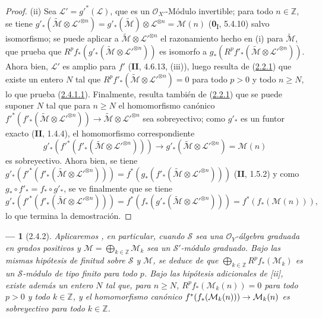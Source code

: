 \documentclass[10pt,oneside,openany]{book}
\theoremstyle{egaenv}\newtheorem*{env}{---}
\theoremstyle{egastatement}
\theoremstyle{egadescription}
\newcommand{\oldpage}[2][]{\marginnote{\normalfont\scriptsize\textbf{#1}\,|\,#2}\ignorespaces}
\renewcommand{\geq}{\geqslant}
\renewcommand{\to}{\mathchoice{\longrightarrow}{\rightarrow}{\rightarrow}{\rightarrow}}
\begin{document}
\begin{proof}
(ii) Sea $\mathcal L'=g'^*(\mathcal L)$, que es un
$\mathcal O_{X'}$-Módulo invertible; para todo $n\in\mathbb Z$, se tiene
$g'_*(\widetilde{\mathcal M}\otimes\mathcal L'^{\otimes n})
=g'_*(\widetilde{\mathcal M})\otimes\mathcal L^{\otimes n}
=\mathcal M(n)$
(\textbf{0}\textsubscript{I}, 5.4.10) salvo isomorfismo; se puede aplicar
a $\widetilde{\mathcal M}\otimes\mathcal L'^{\otimes n}$ el
razonamiento hecho en (i) para $\widetilde{\mathcal M}$, que prueba que
$R^pf_*(g'_*(\widetilde{\mathcal M}\otimes\mathcal L'^{\otimes n}))$
es isomorfo a
$g_*(R^pf'_*(\widetilde{\mathcal M}\otimes\mathcal L'^{\otimes n}))$.
Ahora bien, $\mathcal L'$ es amplio para $f'$ (\textbf{II}, 4.6.13, (iii)), luego resulta
de (\hyperref[III.2.2.1-fr]{2.2.1}) que existe un entero $N$ tal que
$R^pf'_*(\widetilde{\mathcal M}\otimes\mathcal L'^{\otimes n})=0$
para todo $p>0$ y todo $n\geq N$, lo que prueba
(\hyperref[III.2.4.1.1-fr]{2.4.1.1}). Finalmente, resulta también de
(\hyperref[III.2.2.1-fr]{2.2.1}) que se puede suponer $N$ tal que para
$n\geq N$ el homomorfismo canónico
$f'^*(f'_*(\widetilde{\mathcal M}\otimes\mathcal L'^{\otimes n}))
\longrightarrow\widetilde{\mathcal M}\otimes\mathcal L'^{\otimes n}$
sea sobreyectivo; como $g'_*$ es un funtor exacto (\textbf{II}, 1.4.4),
el homomorfismo correspondiente
\[
g'_*(f'^*(f'_*(\widetilde{\mathcal M}\otimes
\mathcal L'^{\otimes n})))
\longrightarrow
g'_*(\widetilde{\mathcal M}\otimes\mathcal L'^{\otimes n})
=\mathcal M(n)
\]
es sobreyectivo. Ahora bien, se tiene
$g'_*(f'^*(f'_*(\widetilde{\mathcal M}\otimes
\mathcal L'^{\otimes n})))
=f^*(g_*(f'_*(\widetilde{\mathcal M}\otimes
\mathcal L'^{\otimes n})))$
(\textbf{II}, 1.5.2) y como $g_*\circ f'_* = f_*\circ g'_*$, se ve
finalmente que se tiene
\[
g'_*(f'^*(f'_*(\widetilde{\mathcal M}\otimes\mathcal L'^{\otimes n})))
=f^*(f_*(g'_*(\widetilde{\mathcal M}\otimes
\mathcal L'^{\otimes n})))=f^*(f_*(\mathcal M(n))),
\]
lo que termina la demostración.
\end{proof}

\begin{env}[2.4.2]
\label{III.2.4.2}
\label{III.2.4.2-fr}
Aplicaremos , en particular, cuando $\mathcal S$ sea una $\mathcal O_Y$-álgebra \emph{graduada} en grados positivos y
$\mathcal M=\bigoplus_{k\in\mathbb Z}\mathcal M_k$
sea un $\mathcal S'$-módulo \emph{graduado}.
\oldpage[III]{109}
Bajo las mismas hipótesis de finitud sobre $\mathcal S$ y $\mathcal M$, se deduce de  que
$\bigoplus_{k\in\mathbb Z}R^pf_*(\mathcal M_k)$
es un $\mathcal S$-módulo \emph{de tipo finito} para todo $p$.
Bajo las hipótesis adicionales de [ii], existe además un entero $N$ tal que, para $n\geq N$,
$R^pf_*(\mathcal M_k(n))=0$
para todo $p>0$ y \emph{todo} $k\in\mathbb Z$, y el homomorfismo canónico
$f^*(f_*(\mathcal M_k(n)))\to\mathcal M_k(n)$
es sobreyectivo para \emph{todo} $k\in\mathbb Z$.
\end{env}
\end{document}
